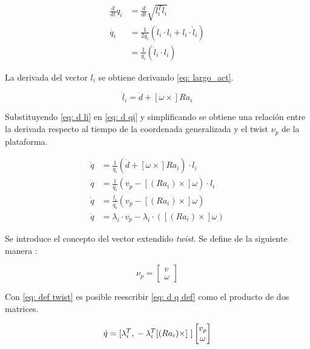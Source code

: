 \begin{equation} \label{eq: d qi}
\begin{split}
\frac{d}{dt}q_i & = \frac{d}{dt}\sqrt{  l_i^T    l_i}  \\
\dot{q_i} & = \frac{1}{2q_i} ( {\dot l_i} \cdot   l_i +   l_i \cdot  {\dot l_i})\\
 &= \frac{1}{q_i} ( {\dot l_i} \cdot   l_i)
\end{split}
\end{equation}

La derivada del vector $  l_i$ se obtiene derivando
\eqref{eq: largo_act}.

\begin{equation}\label{eq: d li}
  {\dot l_i} =  {\dot d} + [  \omega \times] R  a_i
\end{equation}

Substituyendo \eqref{eq: d li} en \eqref{eq: d qi} y 
simplificando se obtiene una relación entre
la derivada respecto al tiempo de la coordenada generalizada 
y el twist  $\nu_p$ de la plataforma.

\begin{equation}\label{eq: d q def}
 \begin{split}
    \dot q  & =\frac{1}{q_i}( {\dot{d}} + [  \omega \times] R   a_i)\cdot   l_i   \\
    \dot q        & = \frac{1}{q_i}(  v_p - [(Ra_i)\times]\omega)\cdot l_i\\
    \dot q        & = \frac{l_i}{q_i}\left(   v_p - [(Ra_i)\times]\omega \right) \\
    \dot q        & =  \lambda_i \cdot   v_p - \lambda_i \cdot ([(Ra_i)\times] \omega)
 \end{split}
\end{equation}

Se introduce el concepto del vector extendido \emph{twist}. 
Se define de la siguiente manera \cite{olguin20183d}:

\begin{equation}\label{eq: def twist}
 \nu_p = \begin{bmatrix}
          v \\
          \omega
       \end{bmatrix}
\end{equation}

Con \eqref{eq: def twist} es posible 
reescribir \eqref{eq: d q def} como el producto de dos 
matrices.

\begin{equation} \label{eq: jac_inv}
\dot{q} = [\lambda_i^T, \\ -\lambda_i^T [(Ra_i)\times]\ ] \begin{bmatrix}
v_p\\
\omega
\end{bmatrix}
\end{equation}

